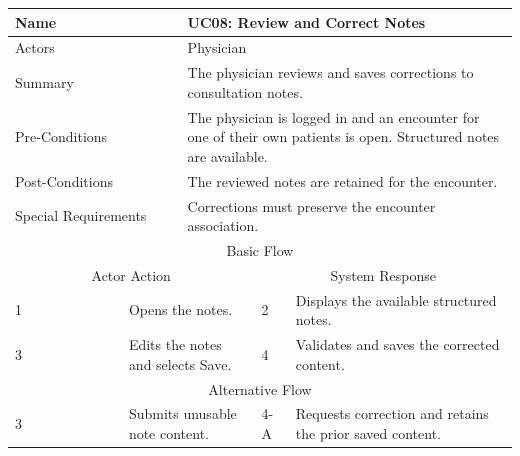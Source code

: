 \begin{reporttable}
\centering
\small
\caption{UC08: Review and Correct Notes.}
\label{tab:kashaf:uc08}
\begin{tabular}{|p{}|p{}|p{}|p{}|p{}|}
\hline
\multicolumn{2}{|p{\dimexpr0.225\textwidth+2\tabcolsep+\arrayrulewidth\relax}|}{Name} & \multicolumn{3}{p{\dimexpr0.575\textwidth+4\tabcolsep+2\arrayrulewidth\relax}|}{UC08: Review and Correct Notes} \\ \hline
\multicolumn{2}{|p{\dimexpr0.225\textwidth+2\tabcolsep+\arrayrulewidth\relax}|}{Actors} & \multicolumn{3}{p{\dimexpr0.575\textwidth+4\tabcolsep+2\arrayrulewidth\relax}|}{Physician} \\ \hline
\multicolumn{2}{|p{\dimexpr0.225\textwidth+2\tabcolsep+\arrayrulewidth\relax}|}{Summary} & \multicolumn{3}{p{\dimexpr0.575\textwidth+4\tabcolsep+2\arrayrulewidth\relax}|}{The physician reviews and saves corrections to consultation notes.} \\ \hline
\multicolumn{2}{|p{\dimexpr0.225\textwidth+2\tabcolsep+\arrayrulewidth\relax}|}{Pre-Conditions} & \multicolumn{3}{p{\dimexpr0.575\textwidth+4\tabcolsep+2\arrayrulewidth\relax}|}{The physician is logged in and an encounter for one of their own patients is open. Structured notes are available.} \\ \hline
\multicolumn{2}{|p{\dimexpr0.225\textwidth+2\tabcolsep+\arrayrulewidth\relax}|}{Post-Conditions} & \multicolumn{3}{p{\dimexpr0.575\textwidth+4\tabcolsep+2\arrayrulewidth\relax}|}{The reviewed notes are retained for the encounter.} \\ \hline
\multicolumn{2}{|p{\dimexpr0.225\textwidth+2\tabcolsep+\arrayrulewidth\relax}|}{Special Requirements} & \multicolumn{3}{p{\dimexpr0.575\textwidth+4\tabcolsep+2\arrayrulewidth\relax}|}{Corrections must preserve the encounter association.} \\ \hline
\multicolumn{5}{|c|}{Basic Flow} \\ \hline
\multicolumn{3}{|c|}{Actor Action} & \multicolumn{2}{c|}{System Response} \\ \hline
1 & \multicolumn{2}{p{\dimexpr0.37\textwidth+2\tabcolsep+\arrayrulewidth\relax}|}{Opens the notes.} & 2 & Displays the available structured notes. \\ \hline
3 & \multicolumn{2}{p{\dimexpr0.37\textwidth+2\tabcolsep+\arrayrulewidth\relax}|}{Edits the notes and selects Save.} & 4 & Validates and saves the corrected content. \\ \hline
\multicolumn{5}{|c|}{Alternative Flow} \\ \hline
3 & \multicolumn{2}{p{\dimexpr0.37\textwidth+2\tabcolsep+\arrayrulewidth\relax}|}{Submits unusable note content.} & 4-A & Requests correction and retains the prior saved content. \\ \hline
\end{tabular}
\end{reporttable}

